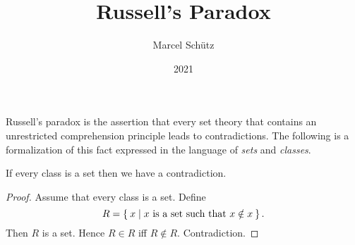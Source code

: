 \documentclass{article}
\title{Russell's Paradox}
\author{Marcel Schütz}
\date{2021}
\begin{document}

  \maketitle

  Russell's paradox is the assertion that every set theory that contains an
  unrestricted comprehension principle leads to contradictions.
  The following is a formalization of this fact expressed in the language of
  \textit{sets} and \textit{classes}.

  \begin{forthel}

    \begin{theorem}[Russell]
      If every class is a set then we have a contradiction.
    \end{theorem}
    \begin{proof}
      Assume that every class is a set.
      Define \[ R = \Set{x | \text{$x$ is a set such that $x \notin x$}}. \]
      Then $R$ is a set.
      Hence $R \in R$ iff $R \notin R$.
      Contradiction.
    \end{proof}
  \end{forthel}
\end{document}
